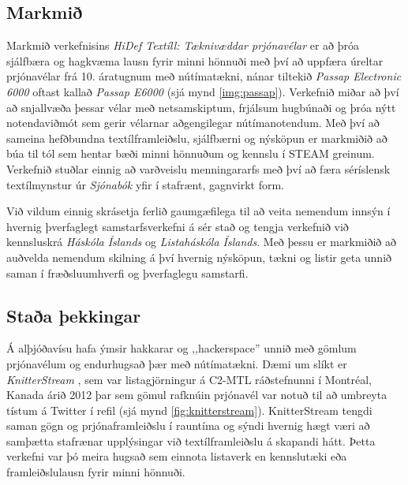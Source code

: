 \documentclass[a4paper,12pt,twoside]{article}
\begin{document}
\subsection{Markmið}
Markmið verkefnisins \emph{HiDef Textíll: Tæknivæddar prjónavélar} er að þróa sjálfbæra og hagkvæma lausn fyrir minni hönnuði með því að uppfæra úreltar prjónavélar frá 10. áratugnum með nútímatækni, nánar tiltekið \textit{Passap Electronic 6000} oftast kallað \textit{Passap E6000} (sjá mynd \ref{img:passap}). Verkefnið miðar að því að snjallvæða þessar vélar með netsamskiptum, frjálsum hugbúnaði og þróa nýtt notendaviðmót sem gerir vélarnar aðgengilegar nútímanotendum. Með því að sameina hefðbundna textíl\-framleiðslu, sjálfbærni og nýsköpun er markmiðið að búa til tól sem hentar bæði minni hönnuðum og kennslu í STEAM greinum. Verkefnið stuðlar einnig að varðveislu menningararfs með því að færa sér\-íslensk textílmynstur úr \emph{Sjónabók} yfir í staf\-rænt, gagnvirkt form.

Við vildum einnig skrásetja ferlið gaumgæfilega til að veita nemendum innsýn í hvernig þverfaglegt samstarfsverkefni á sér stað og tengja verkefnið við kennsluskrá \emph{Háskóla Íslands} og \emph{Listaháskóla Íslands}. Með þessu er markmiðið að auðvelda nemendum skilning á því hvernig nýsköpun, tækni og listir geta unnið saman í fræðsluumhverfi og þverfaglegu samstarfi.

\subsection{Staða þekkingar}

Á alþjóðavísu hafa ýmsir hakkarar og ,,hackerspace'' unnið með gömlum prjónavélum og endurhugsað þær með nútímatækni. Dæmi um slíkt er \emph{KnitterStream} \cite{knitterstream}, sem var listagjörningur á C2-MTL ráðstefnunni í Montréal, Kanada árið 2012 þar sem gömul rafknúin prjónavél var notuð til að umbreyta tístum á Twitter í refil (sjá mynd \ref{fig:knitterstream}). KnitterStream tengdi saman gögn og prjónaframleiðslu í rauntíma og sýndi hvernig hægt væri að samþætta stafrænar upplýsingar við textíl\-framleiðslu á skapandi hátt. Þetta verkefni var þó meira hugsað sem einnota listaverk en kennslutæki eða framleiðslulausn fyrir minni hönnuði.
\end{document}
